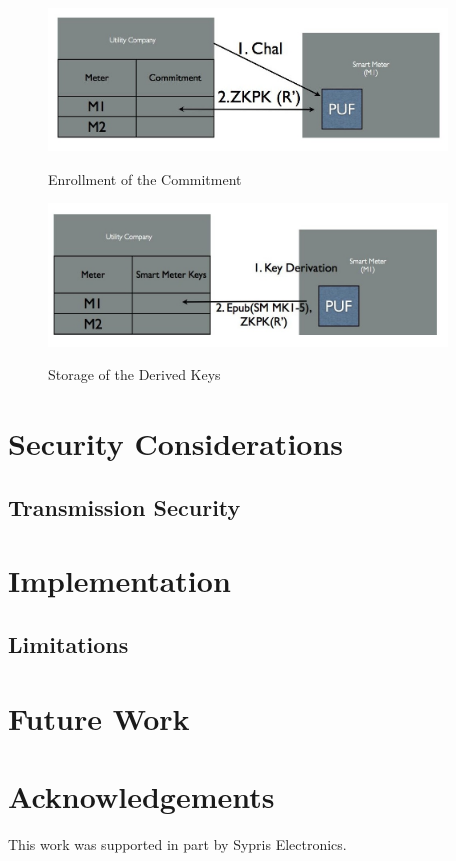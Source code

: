 \begin{figure}[!ht]
\includegraphics[width=400px]{images/doe_auth_config.jpg}
\label{fig:doeconfig}
\caption{Enrollment of the Commitment}
\end{figure}
\FloatBarrier



\begin{figure}[!ht]
\includegraphics[width=400px]{images/doe_key_config.jpg}
\label{fig:doeusage}
\caption{Storage of the Derived Keys}
\end{figure}
\FloatBarrier

\section{Security Considerations}

\subsection{Transmission Security}

\section{Implementation}

\subsection{Limitations}

\section{Future Work}

\section{Acknowledgements}
This work was supported in part by Sypris Electronics.